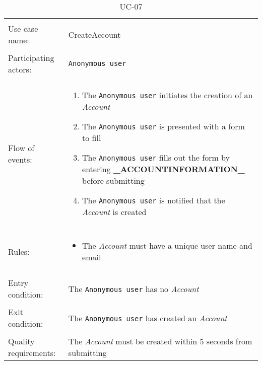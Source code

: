 \documentclass[../report.tex]{subfiles}
\begin{document}
\noindent
\begin{table}
\caption{UC-07}
\label{UC-07}
\begin{tabular}{ l p{8cm} } 
\hline       
\\                
Use case name:  & CreateAccount   \\   \hline  \\              
Participating actors:  & \texttt{Anonymous user} \\   \hline \\
Flow of events: & \begin{enumerate}
\item{The \texttt{Anonymous user} initiates the creation of an \textit{Account}}
\item{The \texttt{Anonymous user} is presented with a form to fill}
\item{The \texttt{Anonymous user} fills out the form by entering \textbf{\_ACCOUNTINFORMATION\_} before submitting} %
\item{The \texttt{Anonymous user} is notified that the \textit{Account} is created}
\end{enumerate}
\\   \hline \\
Rules: & \begin{itemize}
\item{The \textit{Account} must have a unique user name and email}
\end{itemize} \\ \hline \\
Entry condition: & The \texttt{Anonymous user} has no \textit{Account} \\ \hline \\
Exit condition: & The \texttt{Anonymous user} has created an \textit{Account} \\ \hline \\
Quality requirements: & The \textit{Account} must be created within 5 seconds from submitting \\  \hline      
\end{tabular} \\
\end{table}
\end{document}
